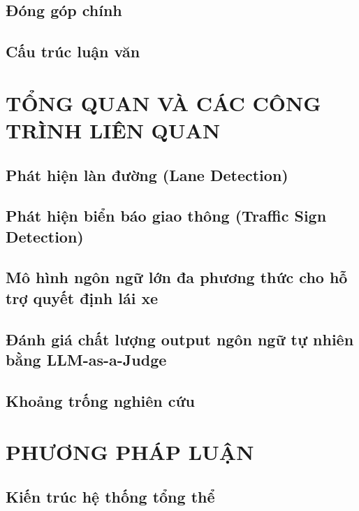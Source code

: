 \documentclass[a4paper,12pt]{report}
\begin{document}
\section{Đóng góp chính}

\section{Cấu trúc luận văn}

\chapter{TỔNG QUAN VÀ CÁC CÔNG TRÌNH LIÊN QUAN}

\section{Phát hiện làn đường (Lane Detection)}

\section{Phát hiện biển báo giao thông (Traffic Sign Detection)}

\section{Mô hình ngôn ngữ lớn đa phương thức cho hỗ trợ quyết định lái xe}

\section{Đánh giá chất lượng output ngôn ngữ tự nhiên bằng LLM-as-a-Judge}

\section{Khoảng trống nghiên cứu}

\chapter{PHƯƠNG PHÁP LUẬN}

\section{Kiến trúc hệ thống tổng thể}
%
\end{document}
